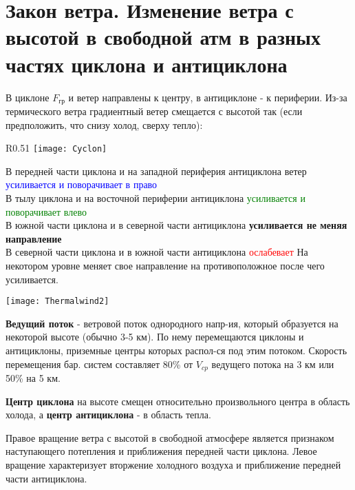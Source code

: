 
\section{Закон ветра. Изменение ветра с высотой в свободной атм в разных частях циклона и антициклона}
В циклоне $F_{\text{гр}}$ и ветер направлены к центру, в антициклоне - к периферии.
Из-за термического ветра градиентный ветер смещается с высотой так (если предположить, что снизу холод, сверху тепло):
\begin{wrapfigure}[7]{R}{0.51\linewidth}
	\vspace{-8ex}
	\texttt{[image: Cyclon]}
\end{wrapfigure}

В передней части циклона и на западной периферия антициклона ветер \textcolor{blue}{усиливается и поворачивает в право} \\
В тылу циклона и на восточной периферии антициклона \textcolor{Green}{усиливается и поворачивает влево}\\
В южной части циклона и в северной части антициклона \textbf{усиливается не меняя направление}\\
В северной части циклона и в южной части антициклона \textcolor{red}{ослабевает} На некотором уровне меняет свое направление на противоположное после чего усиливается.

	\texttt{[image: Thermalwind2]}

\textbf{Ведущий поток} - ветровой поток однородного напр-ия, который образуется на некоторой высоте (обычно 3-5 км). По нему перемещаются циклоны и антициклоны, приземные центры которых распол-ся под этим потоком. Скорость перемещения бар. систем составляет 80\% от $V_{cp}$ ведущего потока на 3 км или 50\% на 5 км.
\par \textbf{Центр циклона} на высоте смещен относительно произвольного центра в область холода, а \textbf{центр антициклона} - в область тепла.
\par Правое вращение ветра с высотой в свободной атмосфере является признаком наступающего потепления и приближения передней части циклона. Левое вращение характеризует вторжение холодного воздуха и приближение передней части антициклона.